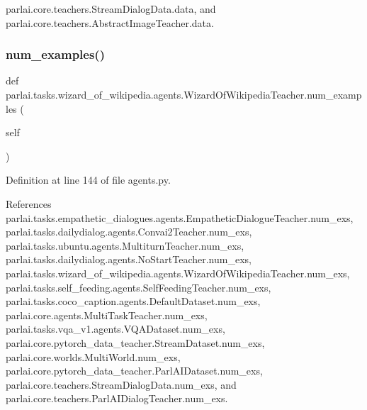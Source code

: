 parlai.\+core.\+teachers.\+Stream\+Dialog\+Data.\+data, and parlai.\+core.\+teachers.\+Abstract\+Image\+Teacher.\+data.

\mbox{\label{classparlai_1_1tasks_1_1wizard__of__wikipedia_1_1agents_1_1WizardOfWikipediaTeacher_afcede137a01b56b211aa5792346b0560}} 
\subsubsection{\texorpdfstring{num\+\_\+examples()}{num\_examples()}}
{\footnotesize\ttfamily def parlai.\+tasks.\+wizard\+\_\+of\+\_\+wikipedia.\+agents.\+Wizard\+Of\+Wikipedia\+Teacher.\+num\+\_\+examples (\begin{DoxyParamCaption}\item[{}]{self }\end{DoxyParamCaption})}



Definition at line 144 of file agents.\+py.



References parlai.\+tasks.\+empathetic\+\_\+dialogues.\+agents.\+Empathetic\+Dialogue\+Teacher.\+num\+\_\+exs, parlai.\+tasks.\+dailydialog.\+agents.\+Convai2\+Teacher.\+num\+\_\+exs, parlai.\+tasks.\+ubuntu.\+agents.\+Multiturn\+Teacher.\+num\+\_\+exs, parlai.\+tasks.\+dailydialog.\+agents.\+No\+Start\+Teacher.\+num\+\_\+exs, parlai.\+tasks.\+wizard\+\_\+of\+\_\+wikipedia.\+agents.\+Wizard\+Of\+Wikipedia\+Teacher.\+num\+\_\+exs, parlai.\+tasks.\+self\+\_\+feeding.\+agents.\+Self\+Feeding\+Teacher.\+num\+\_\+exs, parlai.\+tasks.\+coco\+\_\+caption.\+agents.\+Default\+Dataset.\+num\+\_\+exs, parlai.\+core.\+agents.\+Multi\+Task\+Teacher.\+num\+\_\+exs, parlai.\+tasks.\+vqa\+\_\+v1.\+agents.\+V\+Q\+A\+Dataset.\+num\+\_\+exs, parlai.\+core.\+pytorch\+\_\+data\+\_\+teacher.\+Stream\+Dataset.\+num\+\_\+exs, parlai.\+core.\+worlds.\+Multi\+World.\+num\+\_\+exs, parlai.\+core.\+pytorch\+\_\+data\+\_\+teacher.\+Parl\+A\+I\+Dataset.\+num\+\_\+exs, parlai.\+core.\+teachers.\+Stream\+Dialog\+Data.\+num\+\_\+exs, and parlai.\+core.\+teachers.\+Parl\+A\+I\+Dialog\+Teacher.\+num\+\_\+exs.

